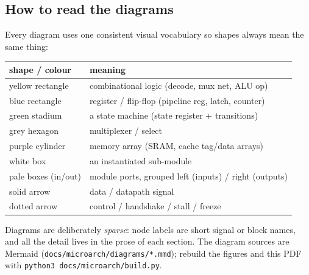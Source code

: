 \subsection{How to read the diagrams}

Every diagram uses one consistent visual vocabulary so shapes always mean the
same thing:

\begin{center}
\begin{tabularx}{\textwidth}{>{\raggedright\arraybackslash}p{3.2cm} Y}
\toprule
\textbf{shape / colour} & \textbf{meaning} \\
\midrule
yellow rectangle      & combinational logic (decode, mux net, ALU op) \\
blue rectangle        & register / flip-flop (pipeline reg, latch, counter) \\
green stadium         & a state machine (state register + transitions) \\
grey hexagon          & multiplexer / select \\
purple cylinder       & memory array (SRAM, cache tag/data arrays) \\
white box             & an instantiated sub-module \\
pale boxes (in/out)   & module ports, grouped left (inputs) / right (outputs) \\
\midrule
solid arrow           & data / datapath signal \\
dotted arrow          & control / handshake / stall / freeze \\
\bottomrule
\end{tabularx}
\end{center}

Diagrams are deliberately \emph{sparse}: node labels are short signal or block
names, and all the detail lives in the prose of each section. The diagram sources
are Mermaid (\texttt{docs/microarch/diagrams/*.mmd}); rebuild the figures and this
PDF with \texttt{python3 docs/microarch/build.py}.

